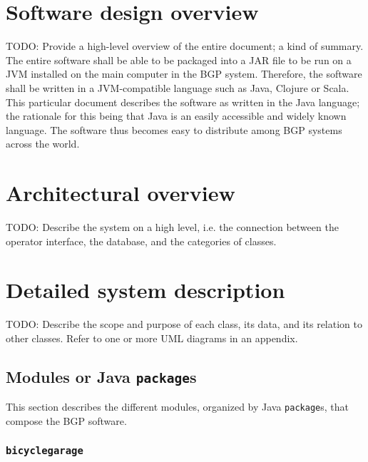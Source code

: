 \documentclass[12pt,titlepage]{article}
\begin{document}

\section{Software design overview}

TODO: Provide a high-level overview of the entire document; a kind of summary.\\

The entire software shall be able to be packaged into a JAR file to be run on a
JVM installed on the main computer in the BGP system. Therefore, the software
shall be written in a JVM-compatible language such as Java, Clojure or Scala.
This particular document describes the software as written in the Java language;
the rationale for this being that Java is an easily accessible and widely known
language. The software thus becomes easy to distribute among BGP systems across
the world.

\section{Architectural overview}
\label{sec:architectural-overview}

TODO: Describe the system on a high level, i.e. the connection between the
operator interface, the database, and the categories of classes.

\section{Detailed system description}
\label{sec:detailed-system-description}

TODO: Describe the scope and purpose of each class, its data, and its relation
to other classes. Refer to one or more UML diagrams in an appendix.

\subsection{Modules or Java \texttt{package}s}

This section describes the different modules, organized by Java
\texttt{package}s, that compose the BGP software.

\subsubsection{\texttt{bicyclegarage}}
\end{document}
